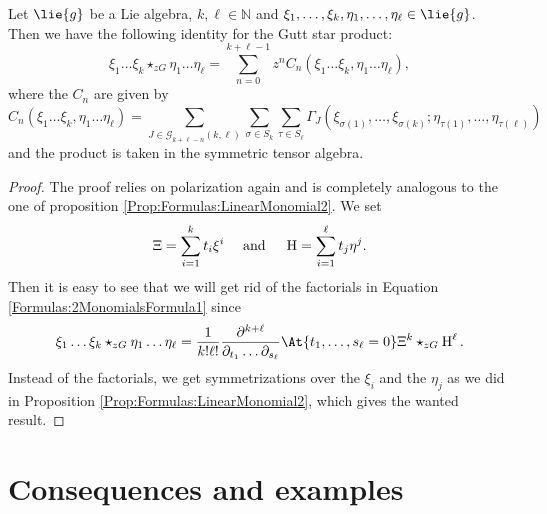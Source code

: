 \begin{proposition}
	\label{Prop:2MonomialsFormula2}
	Let $\lie{g}$ be a Lie algebra, $k, \ell \in \mathbb{N}$ and $\xi_1, 
	\ldots, \xi_k, \eta_1, \ldots, \eta_{\ell} \in \lie{g}$. Then we 
	have the following identity for the Gutt star product:
	\begin{equation*}
    	\xi_1 \ldots \xi_k \star_{zG} \eta_1 \ldots \eta_{\ell}
    	=
	    \sum\limits_{n=0}^{k + \ell -1}
    	z^n C_n
    	\left( 
    		\xi_1 \ldots \xi_k, \eta_1 \ldots \eta_{\ell}
    	\right),
	\end{equation*}
	where the $C_n$ are given by
	\begin{equation}
		\label{Formulas:2MonomialsFormula2}
        C_n
        \left( 
    		\xi_1 \ldots \xi_k, \eta_1 \ldots \eta_{\ell}
    	\right)
        =
        \sum\limits_{J \in \mathcal{G}_{k + \ell - n}(k, \ell)}
        \sum\limits_{\sigma \in S_k}
        \sum\limits_{\tau \in S_{\ell}}
        \Gamma_J 
        \left(
        	\xi_{\sigma(1)}, \ldots, \xi_{\sigma(k)};
        	\eta_{\tau(1)}, \ldots, \eta_{\tau(\ell)}
        \right)
	\end{equation}
	and the product is taken in the symmetric tensor algebra.
\end{proposition}
\begin{proof}
	The proof relies on polarization again and is completely analogous 
	to the one of proposition \ref{Prop:Formulas:LinearMonomial2}. We set
	\begin{equation*}
		\Xi
		=
		\sum\limits_{i=1}^k t_i \xi^i
		\quad \text{ and } \quad
		\operatorname{H}
		=
		\sum\limits_{i=1}^{\ell} t_j \eta^j
		.
	\end{equation*}
	Then it is easy to see that we will get rid of the factorials in Equation 
	\eqref{Formulas:2MonomialsFormula1} since
	\begin{equation*}
		\xi_1 \ldots \xi_k \star_{zG} \eta_1 \ldots \eta_{\ell}
		=
		\frac{1}{k! \ell!}
		\frac{\partial^{k + \ell}}
		{\partial_{t_1} \ldots \partial_{s_{\ell}}}
		\At{t_1, \ldots, s_{\ell} = 0}
		\Xi^k \star_{zG} \Eta^{\ell}.
	\end{equation*}
	Instead of the factorials, we get symmetrizations over the 
	$\xi_i$ and the $\eta_j$ as we did in Proposition 
	\ref{Prop:Formulas:LinearMonomial2}, which gives the wanted result.
\end{proof}



\section{Consequences and examples}
\label{sec:chap4_Consequences}

